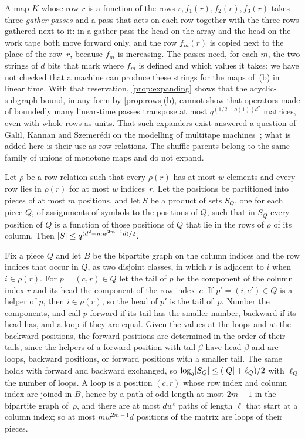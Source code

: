 A map $K$ whose row $r$ is a function of the rows $r,f_1(r),f_2(r),f_3(r)$ takes three \emph{gather passes} and a
pass that acts on each row together with the three rows gathered next to it: in a gather pass the head on the array and the head on the work tape both
move forward only, and the row $f_m(r)$ is copied next to the place of the row~$r$, because $f_m$ is increasing. The
passes need, for each $m$, the two strings of $d$ bits that mark where $f_m$ is defined and which values it takes;
we have not checked that a machine can produce these strings for the maps of~(b) in linear time. With that
reservation, \cref{prop:expanding} shows that the acyclic-subgraph bound, in any form by \cref{prop:rows}(b), cannot
show that operators made of boundedly many linear-time passes transpose at most $q^{(1/2+o(1))d^2}$ matrices, even
with whole rows as units. That such expanders exist answered a question of Galil, Kannan and Szemer\'edi on the
modelling of multitape machines~\cite{GalilKannanSzemeredi1989,DujmovicSidiropoulosWood2016}; what is added here is
their use as row relations. The shuffle parents belong to the same family of unions of monotone maps and do not
expand.

\begin{proposition}\label{prop:pieces}
\notformalized
Let $\rho$ be a row relation such that every $\rho(r)$ has at most $w$ elements and every row lies in $\rho(r)$ for
at most $w$ indices~$r$. Let the positions be partitioned into pieces of at most $m$ positions, and let $S$ be a
product of sets $S_Q$, one for each piece $Q$, of assignments of symbols to the positions of $Q$, such that in $S_Q$
every position of $Q$ is a function of those positions of $Q$ that lie in the rows of $\rho$ of its column. Then
$\lvert S \rvert\le q^{(d^2+mw^{2m-1}d)/2}$.
\end{proposition}

\begin{informalproof}
Fix a piece $Q$ and let $B$ be the bipartite graph on the column indices and the row indices that occur in $Q$, as two
disjoint classes, in which $r$ is adjacent to $i$ when $i\in\rho(r)$. For $p=(c,r)\in Q$ let the tail of $p$ be the
component of the column index $r$ and its head the component of the row index~$c$. If $p'=(i,c')\in Q$ is a helper
of $p$, then $i\in\rho(r)$, so the head of $p'$ is the tail of~$p$. Number the components, and call $p$ forward if
its tail has the smaller number, backward if its head has, and a loop if they are equal. Given the values at the
loops and at the backward positions, the forward positions are determined in the order of their tails, since the
helpers of a forward position with tail $\beta$ have head $\beta$ and are loops, backward positions, or forward
positions with a smaller tail. The same holds with forward and backward exchanged, so
$\log_q\lvert S_Q \rvert\le(\lvert Q \rvert+\ell_Q)/2$ with $\ell_Q$ the number of loops. A loop is a position $(c,r)$ whose row
index and column index are joined in $B$, hence by a path of odd length at most $2m-1$ in the bipartite graph
of~$\rho$, and there are at most $dw^\ell$ paths of length $\ell$ that start at a column index; so at most
$mw^{2m-1}d$ positions of the matrix are loops of their pieces.
\end{informalproof}

